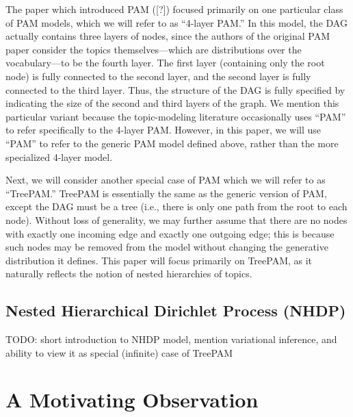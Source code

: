 \documentclass{article}
\theoremstyle{definition}
\newcommand{\tocite}{[?]}
\begin{document}
The paper which introduced PAM (\tocite{}) focused primarily on one particular class of PAM models, which we will refer to as ``4-layer PAM.''
In this model, the DAG actually contains three layers of nodes, since the authors of the original PAM paper consider the topics themselves---which are distributions over the vocabulary---to be the fourth layer.
The first layer (containing only the root node) is fully connected to the second layer, and the second layer is fully connected to the third layer.
Thus, the structure of the DAG is fully specified by indicating the size of the second and third layers of the graph.
We mention this particular variant because the topic-modeling literature occasionally uses ``PAM'' to refer specifically to the 4-layer PAM.
However, in this paper, we will use ``PAM'' to refer to the generic PAM model defined above, rather than the more specialized 4-layer model.

Next, we will consider another special case of PAM which we will refer to as ``TreePAM.''
TreePAM is essentially the same as the generic version of PAM, except the DAG must be a tree (i.e., there is only one path from the root to each node).
Without loss of generality, we may further assume that there are no nodes with exactly one incoming edge and exactly one outgoing edge; this is because such nodes may be removed from the model without changing the generative distribution it defines.
This paper will focus primarily on TreePAM, as it naturally reflects the notion of nested hierarchies of topics.

\subsection{Nested Hierarchical Dirichlet Process (NHDP)}

TODO: short introduction to NHDP model, mention variational inference, and ability to view it as special (infinite) case of TreePAM

\section{A Motivating Observation}
\end{document}
